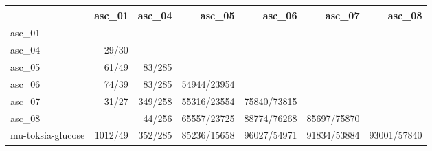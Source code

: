 \begin{tabular}{lrrrrrr}
\toprule
 & asc_01 & asc_04 & asc_05 & asc_06 & asc_07 & asc_08 \\
\midrule
asc_01 &  &  &  &  &  &  \\
asc_04 & 29/30 &  &  &  &  &  \\
asc_05 & 61/49 & 83/285 &  &  &  &  \\
asc_06 & 74/39 & 83/285 & 54944/23954 &  &  &  \\
asc_07 & 31/27 & 349/258 & 55316/23554 & 75840/73815 &  &  \\
asc_08 &  & 44/256 & 65557/23725 & 88774/76268 & 85697/75870 &  \\
mu-toksia-glucose & 1012/49 & 352/285 & 85236/15658 & 96027/54971 & 91834/53884 & 93001/57840 \\
\bottomrule
\end{tabular}
